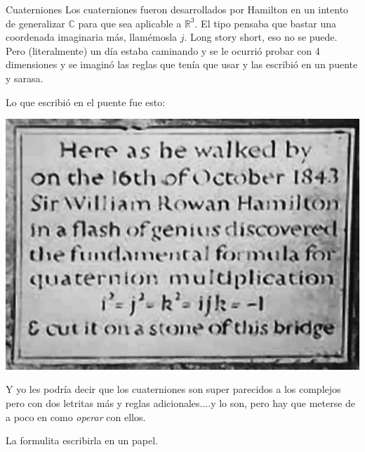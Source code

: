 \documentclass[10pt]{beamer}
\def\R{\mathbb{R}}
\def\C{\mathbb{C}}
\begin{document}
\begin{frame}{Cuaterniones}
	Los cuaterniones fueron desarrollados por Hamilton en un intento de generalizar $\C$ para que sea aplicable a $\R^3$. El tipo pensaba que bastar una coordenada imaginaria más, llamémosla $j$. Long story short, eso no se puede. Pero (literalmente) un día estaba caminando y se le ocurrió probar con 4 dimensiones y se imaginó las reglas que tenía que usar y las escribió en un puente y sarasa.
\end{frame}

\begin{frame}
	Lo que escribió en el puente fue esto:
	
	\includegraphics[scale=0.5]{hamilton.png}
	
	Y yo les podría decir que los cuaterniones son super parecidos a los complejos pero con dos letritas más y reglas adicionales....y lo son, pero hay que meterse de a poco en como \textit{operar} con ellos.
	
	La formulita escribirla en un papel.
\end{frame}
\end{document}
